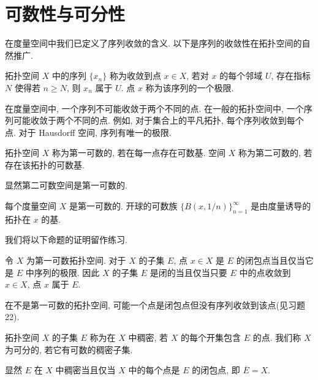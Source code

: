 \documentclass[../../main.tex]{subfiles}
\begin{document}
\section{可数性与可分性}\label{section:ch11-可数性可分性}

在度量空间中我们已定义了序列收敛的含义. 以下是序列的收敛性在拓扑空间的自然推广.

\begin{definition}[序列收敛]\label{definition:ch11-序列收敛}
拓扑空间 $X$ 中的序列 $\{x_{n}\}$ 称为收敛到点 $x\in X$, 若对 $x$ 的每个邻域 $U$, 存在指标 $N$ 使得若 $n\geqslant N$, 则 $x_{n}$ 属于 $U$. 点 $x$ 称为该序列的一个极限.
\end{definition}

在度量空间中, 一个序列不可能收敛于两个不同的点. 在一般的拓扑空间中, 一个序列可能收敛于两个不同的点. 例如, 对于集合上的平凡拓扑, 每个序列收敛到每个点. 对于 Hausdorff 空间, 序列有唯一的极限.

\begin{definition}[第一与第二可数]\label{definition:ch11-第一第二可数}
拓扑空间 $X$ 称为第一可数的, 若在每一点存在可数基. 空间 $X$ 称为第二可数的, 若存在该拓扑的可数基.
\end{definition}

显然第二可数空间是第一可数的.

\begin{example}\label{example:ch11-度量第一可数}
每个度量空间 $X$ 是第一可数的. 开球的可数族 $\{B(x,1/n)\}_{n=1}^{\infty}$ 是由度量诱导的拓扑在 $x$ 的基.
\end{example}

我们将以下命题的证明留作练习.

\begin{proposition}\label{proposition:ch11-第一可数闭包}
令 $X$ 为第一可数拓扑空间. 对于 $X$ 的子集 $E$, 点 $x\in X$ 是 $E$ 的闭包点当且仅当它是 $E$ 中序列的极限. 因此 $X$ 的子集 $E$ 是闭的当且仅当只要 $E$ 中的点收敛到 $x\in X$, 点 $x$ 属于 $E$.
\end{proposition}

在不是第一可数的拓扑空间, 可能一个点是闭包点但没有序列收敛到该点(见习题 22).

\begin{definition}[稠密与可分]\label{definition:ch11-稠密可分}
拓扑空间 $X$ 的子集 $E$ 称为在 $X$ 中稠密, 若 $X$ 的每个开集包含 $E$ 的点. 我们称 $X$ 为可分的, 若它有可数的稠密子集.
\end{definition}

显然 $E$ 在 $X$ 中稠密当且仅当 $X$ 中的每个点是 $E$ 的闭包点, 即 $\overline{E}=X$.
\end{document}
